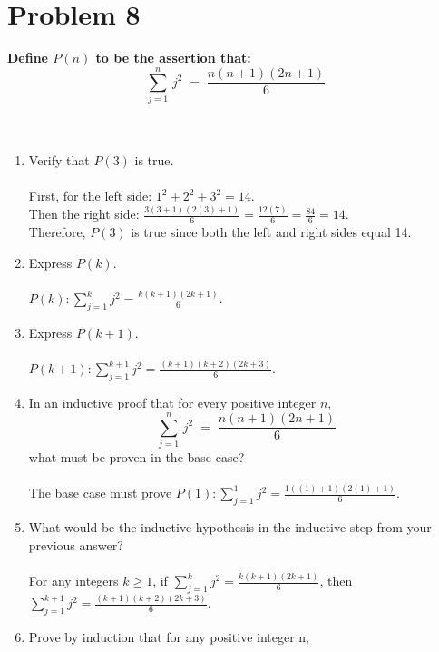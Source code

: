 \documentclass{amsart}
\theoremstyle{definition}
\theoremstyle{Exercise}
\theoremstyle{remark}
\theoremstyle{rule}
\numberwithin{equation}{section}
\begin{document}
\newpage

\section*{Problem 8}
{\bf Define $P(n)$ to be the assertion that:}\\
\[\displaystyle \sum_{j=1}^{n}\, j^2 \;=\;\frac{n(n+1)(2n+1)}{6}\]\\\\
\begin{enumerate}[label=(\alph*)]
  \item Verify that $P(3)$ is true.\\\\
   First, for the left side: $1^2 + 2^2 + 3^2 = 14$.\\
   Then the right side: $\frac{3(3+1)(2(3)+1)}{6} = \frac{12(7)}{6} = \frac{84}{6} = 14$.\\
   Therefore, $P(3)$ is true since both the left and right sides equal 14.\\
  \item Express $P(k)$.\\\\
   $P(k): \sum_{j=1}^{k} j^2 = \frac{k(k+1)(2k+1)}{6}$.\\
  \item Express $P(k+1)$.\\\\
   $P(k+1): \sum_{j=1}^{k+1} j^2 = \frac{(k+1)(k+2)(2k+3)}{6}$.\\
   \item In an inductive proof that for every positive integer $n$,
   \[\displaystyle \sum_{j=1}^{n}\, j^2 \;=\;\frac{n(n+1)(2n+1)}{6}\]
   what must be proven in the base case?\\\\
    The base case must prove $P(1): \sum_{j=1}^{1} j^2 = \frac{1((1)+1)(2(1)+1)}{6}$.\\
   \item What would be the inductive hypothesis in the inductive step from your previous answer?\\\\
    For any integers $k \geq 1$, if $\sum_{j=1}^{k} j^2 = \frac{k(k+1)(2k+1)}{6}$, then $\sum_{j=1}^{k+1} j^2 = \frac{(k+1)(k+2)(2k+3)}{6}$.\\
   \item Prove by induction that for any positive integer n,

\end{enumerate}
\end{document}
